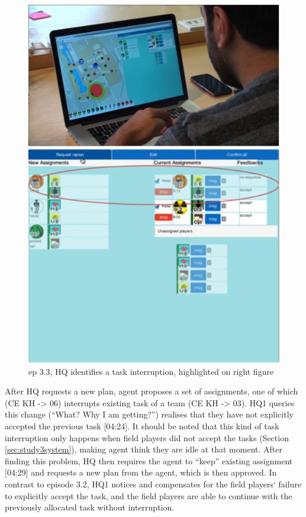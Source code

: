 \begin{figure}[ht]
\centering
\begin{minipage}[b]{0.45\linewidth}
\includegraphics[width=1\textwidth]{img/study3/ep31}


\end{minipage}
\quad
\begin{minipage}[b]{0.45\linewidth}
 \includegraphics[width=1\textwidth]{img/study3/ep32}
\end{minipage}
\label{fig:study3ep31}
\caption{ep 3.3, HQ identifies a task interruption, highlighted on right figure}
\end{figure}

After HQ requests a new plan, agent proposes a set of assignments, one of which (CE KH -> 06) interrupts existing task of a team (CE KH -> 03). HQ1 queries this change (``What? Why I am getting?'') realises that they have not explicitly accepted the previous task [04:24]. It should be noted that this kind of task interruption only happens when field players did not accept the tasks (Section \ref{sec:study3system}), making agent think they are idle at that moment. After finding this problem, HQ then requires the agent to ``keep'' existing assignment [04:29] and requests a new plan from the agent, which is then approved. In contrast to episode 3.2, HQ1 notices and compensates for the field players` failure to explicitly accept the task, and the field players are able to continue with the previously allocated task without interruption.\\

